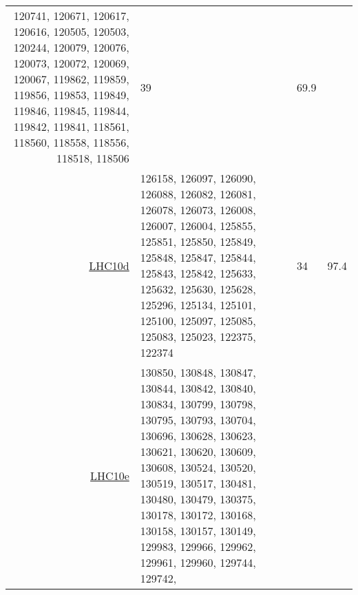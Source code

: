 \begin{table}[h]
\begin{tabularx}{\textwidth}{r|Xll}
                                120741, 120671, 120617, 120616, 120505, 120503, 120244, 120079, 120076, 120073,
                                120072, 120069, 120067, 119862, 119859, 119856, 119853, 119849, 119846, 119845,
                                119844, 119842, 119841, 118561, 118560, 118558, 118556, 118518, 118506				&39				&69.9							\\
\href{https://alimonitor.cern.ch/configuration/index.jsp?partition=LHC10d\&pass=4\&s=\&raw_run=\&filling_scheme=\&filling_config=\&fillno=\&energy=\&intensity_per_bunch=\&mu=\&interacting_bunches=\&noninteracting_bunches_beam_1=\&noninteracting_bunches_beam_2=\&interaction_trigger=\&rate=\&beam_empty_trigger=\&empty_empty_trigger=\&muon_trigger=\&high_multiplicity_trigger=\&emcal_trigger=\&calibration_trigger=\&quality=1\&muon_quality=\&physics_selection_status=\&comment=\&field=\&det_aco=\&det_ad0=\&det_emc=\&det_fmd=\&det_hlt=\&det_hmp=\&det_mch=\&det_mtr=\&det_phs=\&det_pmd=\&det_spd=\&det_sdd=\&det_ssd=\&det_tof=X\&det_tpc=X\&det_trd=\&det_t00=X\&det_v00=X\&det_zdc=\&hlt_mode=\&changedon=}{LHC10d}		&126158, 126097, 126090, 126088, 126082, 126081, 126078, 126073, 126008, 126007,
                                126004, 125855, 125851, 125850, 125849, 125848, 125847, 125844, 125843, 125842,
                                125633, 125632, 125630, 125628, 125296, 125134, 125101, 125100, 125097, 125085,
                                125083, 125023, 122375, 122374 				&34				&97.4								\\
\href{https://alimonitor.cern.ch/configuration/index.jsp?partition=LHC10e\&pass=4\&s=\&raw_run=\&filling_scheme=\&filling_config=\&fillno=\&energy=\&intensity_per_bunch=\&mu=\&interacting_bunches=\&noninteracting_bunches_beam_1=\&noninteracting_bunches_beam_2=\&interaction_trigger=\&rate=\&beam_empty_trigger=\&empty_empty_trigger=\&muon_trigger=\&high_multiplicity_trigger=\&emcal_trigger=\&calibration_trigger=\&quality=1\&muon_quality=\&physics_selection_status=\&comment=\&field=\&det_aco=\&det_ad0=\&det_emc=\&det_fmd=\&det_hlt=\&det_hmp=\&det_mch=\&det_mtr=\&det_phs=\&det_pmd=\&det_spd=\&det_sdd=\&det_ssd=\&det_tof=X\&det_tpc=X\&det_trd=\&det_t00=X\&det_v00=X\&det_zdc=\&hlt_mode=\&changedon=}{LHC10e}		&130850, 130848, 130847, 130844, 130842, 130840, 130834, 130799, 130798, 130795,
                                130793, 130704, 130696, 130628, 130623, 130621, 130620, 130609, 130608, 130524,
                                130520, 130519, 130517, 130481, 130480, 130479, 130375, 130178, 130172, 130168,
                                130158, 130157, 130149, 129983, 129966, 129962, 129961, 129960, 129744, 129742,

\end{tabularx}
\end{table}
